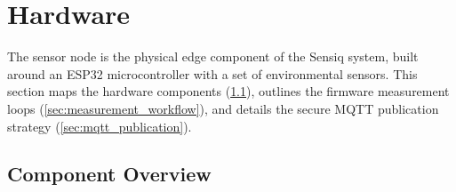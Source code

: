 \section{Hardware}\label{sec:hardware}

The sensor node is the physical edge component of the Sensiq system,
built around an ESP32 microcontroller with a set of environmental sensors.
This section maps the hardware components (\cref{sec:component_overview}),
outlines the firmware measurement loops (\cref{sec:measurement_workflow}),
and details the secure MQTT publication strategy (\cref{sec:mqtt_publication}).

\subsection{Component Overview}\label{sec:component_overview}


